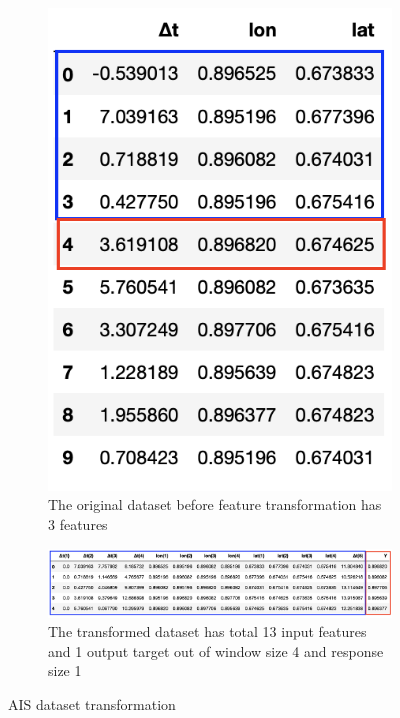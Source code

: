 \begin{figure}[t!]
\centering
\begin{subfigure}[b]{.30\textwidth}
  \centering
  \includegraphics[width=1\linewidth]{pic/ch-Univariate/original.png}
  \caption{The original dataset before feature transformation has 3 features}
  \label{fig:original}
\end{subfigure}
%
\begin{subfigure}[b]{.85\textwidth}
  \centering
  \includegraphics[width=1\linewidth]{pic/ch-Univariate/transformed.png}
  \caption{The transformed dataset has total 13 input features and 1 output target out of window size 4 and response size 1}
  \label{fig:after_transformed}
\end{subfigure}
\caption{AIS dataset transformation}
\label{fig:transformed}
\end{figure}

